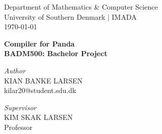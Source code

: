 

\usepackage[block=ragged, sorting=nyt, style=authoryear-ibid, backend=biber]{biblatex}
\setlength{}



\begin{titlepage}
    \begin{centering}
    \vspace*{-20px}\large Department of Mathematics \& Computer Science\\
    University of Southern Denmark $|$ IMADA \\
    \today \\
    
    \vspace{\fill}
    
    \huge{\bf  Compiler for Panda} \\
    \Large{\bf BADM500: Bachelor Project}
    
    \vspace{\fill}
    
    \begin{minipage}{0.45\textwidth} 
    \begin{flushleft}
        \Large
        \textit{Author}\\
        KIAN BANKE LARSEN\\
        kilar20@student.sdu.dk
    \end{flushleft}
    \end{minipage}
    
    \vspace{\fill}
    
    \begin{minipage}{0.45\textwidth}
    \begin{flushleft}
        \Large
        \textit{Supervisor}\\
        KIM SKAK LARSEN\\
        Professor
    \end{flushleft}
    \end{minipage}
    
    \vspace{\fill}
    
    
    
    \vspace*{0.1cm}
    
    \end{centering}
    
    \thispagestyle{empty}
\end{titlepage}

